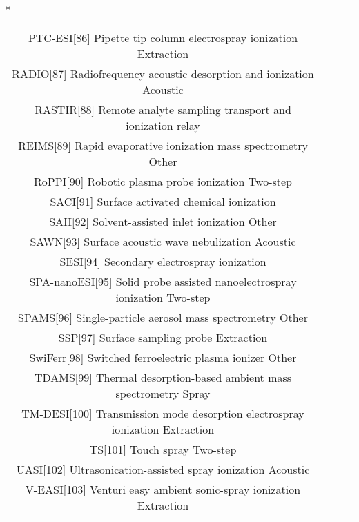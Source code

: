 \begin{table}{*}
\begin{tabular}{|c|c|c|l|}
PTC-ESI[86] Pipette tip column electrospray ionization Extraction \\
RADIO[87] Radiofrequency acoustic desorption and ionization Acoustic \\
RASTIR[88] Remote analyte sampling transport and ionization relay \\ 
REIMS[89] Rapid evaporative ionization mass spectrometry Other \\
RoPPI[90] Robotic plasma probe ionization Two-step \\
SACI[91] Surface activated chemical ionization  \\
SAII[92] Solvent-assisted inlet ionization Other \\
SAWN[93] Surface acoustic wave nebulization Acoustic \\
SESI[94] Secondary electrospray ionization  \\
SPA-nanoESI[95] Solid probe assisted nanoelectrospray ionization Two-step \\
SPAMS[96] Single-particle aerosol mass spectrometry Other \\
SSP[97] Surface sampling probe Extraction \\
SwiFerr[98] Switched ferroelectric plasma ionizer Other \\
    TDAMS[99] Thermal desorption-based ambient mass spectrometry Spray \\
    TM-DESI[100] Transmission mode desorption electrospray ionization Extraction \\
    TS[101] Touch spray Two-step \\
    UASI[102] Ultrasonication-assisted spray ionization Acoustic \\
    V-EASI[103] Venturi easy ambient sonic-spray ionization Extraction \\
    \hline \hline 
    \end{tabular} 
\end{table}